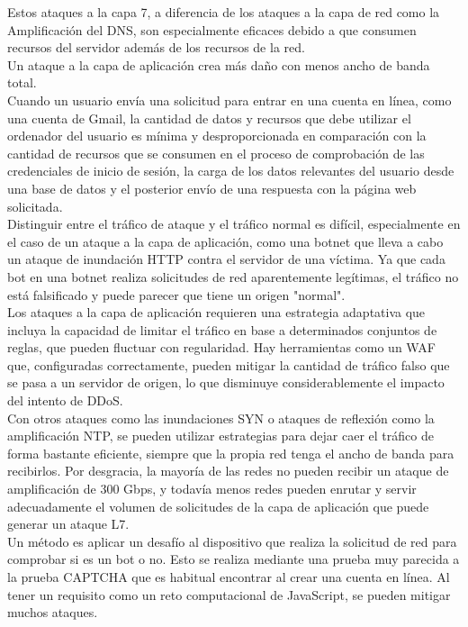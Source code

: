 \documentclass[14pt]{book}
\begin{document}
Estos ataques a la capa 7, a diferencia de los ataques a la capa de red como la Amplificación del DNS, son especialmente eficaces debido a que consumen recursos del servidor además de los recursos de la red.\\
Un ataque a la capa de aplicación crea más daño con menos ancho de banda total.\\

Cuando un usuario envía una solicitud para entrar en una cuenta en línea, como una cuenta de Gmail, la cantidad de datos y recursos que debe utilizar el ordenador del usuario es mínima y desproporcionada en comparación con la cantidad de recursos que se consumen en el proceso de comprobación de las credenciales de inicio de sesión, la carga de los datos relevantes del usuario desde una base de datos y el posterior envío de una respuesta con la página web solicitada.\\

Distinguir entre el tráfico de ataque y el tráfico normal es difícil, especialmente en el caso de un ataque a la capa de aplicación, como una botnet que lleva a cabo un ataque de inundación HTTP contra el servidor de una víctima. Ya que cada bot en una botnet realiza solicitudes de red aparentemente legítimas, el tráfico no está falsificado y puede parecer que tiene un origen "normal".\\

Los ataques a la capa de aplicación requieren una estrategia adaptativa que incluya la capacidad de limitar el tráfico en base a determinados conjuntos de reglas, que pueden fluctuar con regularidad. Hay herramientas como un WAF que, configuradas correctamente, pueden mitigar la cantidad de tráfico falso que se pasa a un servidor de origen, lo que disminuye considerablemente el impacto del intento de DDoS.\\

Con otros ataques como las inundaciones SYN o ataques de reflexión como la amplificación NTP, se pueden utilizar estrategias para dejar caer el tráfico de forma bastante eficiente, siempre que la propia red tenga el ancho de banda para recibirlos. Por desgracia, la mayoría de las redes no pueden recibir un ataque de amplificación de 300 Gbps, y todavía menos redes pueden enrutar y servir adecuadamente el volumen de solicitudes de la capa de aplicación que puede generar un ataque L7.\\

Un método es aplicar un desafío al dispositivo que realiza la solicitud de red para comprobar si es un bot o no. Esto se realiza mediante una prueba muy parecida a la prueba CAPTCHA que es habitual encontrar al crear una cuenta en línea. Al tener un requisito como un reto computacional de JavaScript, se pueden mitigar muchos ataques.\\
\end{document}

